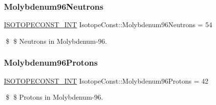 \subsubsection{\texorpdfstring{Molybdenum96\+Neutrons}{Molybdenum96Neutrons}}
{\footnotesize\ttfamily \mbox{\hyperlink{group___isotope_const-_macros_ga5f18360b3e99483a35c32d789e62621c}{I\+S\+O\+T\+O\+P\+E\+C\+O\+N\+S\+T\+\_\+\+I\+NT}} Isotope\+Const\+::\+Molybdenum96\+Neutrons = 54}

\$ \$ Neutrons in Molybdenum-\/96. \mbox{\label{group___isotope_const-_molybdenum-_mo96_ga0d97259f257b867dcebe04048b5c2a75}} 
\subsubsection{\texorpdfstring{Molybdenum96\+Protons}{Molybdenum96Protons}}
{\footnotesize\ttfamily \mbox{\hyperlink{group___isotope_const-_macros_ga5f18360b3e99483a35c32d789e62621c}{I\+S\+O\+T\+O\+P\+E\+C\+O\+N\+S\+T\+\_\+\+I\+NT}} Isotope\+Const\+::\+Molybdenum96\+Protons = 42}

\$ \$ Protons in Molybdenum-\/96. 